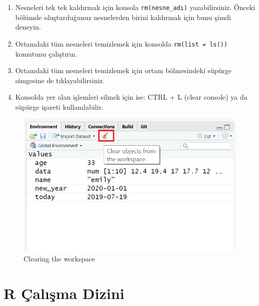 \documentclass[
  oneside]{book}
\begin{document}
\begin{enumerate}
\def\labelenumi{\arabic{enumi}.}
\item
  Nesneleri tek tek kaldırmak için konsola \texttt{rm(nesne\_adı)} yazabilirsiniz. Önceki bölümde oluşturduğunuz nesnelerden birini kaldırmak için bunu şimdi deneyin.
\item
  Ortamdaki tüm nesneleri temizlemek için konsolda \texttt{rm(list\ =\ ls())} komutunu çalıştırın.
\item
  Ortamdaki tüm nesneleri temizlemek için ortam bölmesindeki süpürge simgesine de tıklayabilirsiniz.
\item
  Konsolda yer alan işlemleri silmek için ise: CTRL + L (clear console) ya da süpürge işareti kullanılabilir.
\end{enumerate}

\begin{figure}

{\centering \includegraphics[width=1\linewidth]{images/broom} 

}

\caption{Clearing the workspace}\label{fig:img-broom}
\end{figure}

\hypertarget{r-uxe7alux131ux15fma-dizini}{%
\section{R Çalışma Dizini}\label{r-uxe7alux131ux15fma-dizini}}
\end{document}
